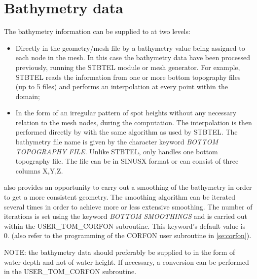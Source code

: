 \section{ Bathymetry data }
\label{se:bathydata}
 The bathymetry information can be supplied to \tomawac at two levels:

\begin{itemize}
\item  Directly in the geometry/mesh file by a bathymetry value being assigned to each
  node in the mesh. In this case the bathymetry data have been processed previously,
  running the STBTEL module or mesh generator. For example, STBTEL reads the information
  from one or more bottom topography files (up to 5 files) and performs an interpolation
  at every point within the domain;

\item  In the form of an irregular pattern of spot heights without any necessary
  relation to the mesh nodes, during the \tomawac computation. The interpolation is
  then performed directly by \tomawac with the same algorithm as used by STBTEL. The
  bathymetry file name is given by the character keyword \textit{BOTTOM TOPOGRAPHY
    FILE. }Unlike STBTEL, \tomawac only handles one bottom topography file. The file
  can be in SINUSX format or can consist of three columns X,Y,Z.
\end{itemize}

\tomawac also provides an opportunity to carry out a smoothing of the bathymetry in
order to get a more consistent geometry. The smoothing algorithm can be iterated several
times in order to achieve more or less extensive smoothing. The number of iterations
is set using the keyword \textit{BOTTOM SMOOTHINGS} and is carried out within the
USER\_TOM\_CORFON subroutine. This keyword's default value is 0. (also refer to the
programming of the CORFON user subroutine in \ref{se:corfon}).

NOTE: the bathymetry data should preferably be supplied to \tomawac in the form of
water depth and not of water height. If necessary, a conversion can be performed in
the USER\_TOM\_CORFON subroutine.


